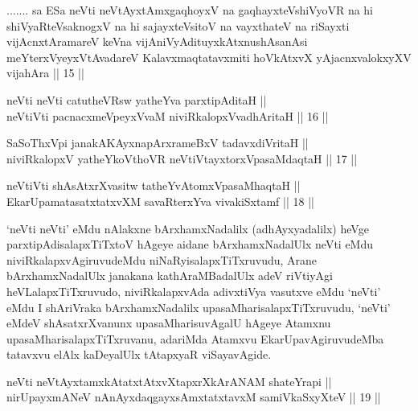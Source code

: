 \begin{kandikeshl}
....... sa ESa neVti neVtAyxtAmxgaqhoyxV na gaqhayxteV\s shiVyoVR na hi shiVyaRteV\s saknogxV na hi sajayxteV\s sitoV na vayxthateV na riSayxti vijAcnxtAramareV keVna vijAniVyAdituyxkAtxnushAsanAsi meYterxVyeyxVtAvadareV Kalavxmaqtatavxmiti hoVkAtxvX yAjacnxvalokxyXV vijahAra || 15 ||
\end{kandikeshl}

\begin{shl}
neVti neVti catutheVR\s sw yatheYva parxtipAditaH || \\
neVtiVti pacnacxmeV\s peyxVvaM niviRkalopxV\s vadhAritaH \hfill || 16 ||  
\end{shl}
				
\begin{shl}
SaSoThxV\s pi janakAKAyxnapArxrameBxV tadavxdiVritaH || \\
niviRkalopxV yatheYkoV\s thoVR  neVtiVtayxtorxVpasaMdaqtaH \hfill || 17 ||  
\end{shl}

\begin{shl}
neVtiVti shAsAtxrXvasitw tatheYvA\s \s tomxVpasaMhaqtaH || \\
EkarUpamatasatxtatxvXM savaRterxYva vivakiSxtamf \hfill || 18 ||  
\end{shl}

\begin{artha}
`neVti neVti' eMdu nAlakxne bArxhamxNadalilx (adhAyxyadalilx) heVge parxtipAdisalapxTiTxtoV hAgeye aidane bArxhamxNadalUlx neVti eMdu niviRkalapxvAgiruvudeMdu niNaRyisalapxTiTxruvudu, Arane bArxhamxNadalUlx janakana kathAraMBadalUlx adeV riVtiyAgi heVLalapxTiTxruvudo, niviRkalapxvAda adivxtiVya vasutxve eMdu `neVti' eMdu I shAriVraka bArxhamxNadalilx upasaMharisalapxTiTxruvudu, `neVti' eMdeV shAsatxrXvanunx upasaMharisuvAgalU hAgeye Atamxnu upasaMharisalapxTiTxruvanu, adariMda Atamxvu EkarUpavAgiruvudeMba tatavxvu elAlx kaDeyalUlx tAtapxyaR viSayavAgide.
\end{artha}

\begin{shl}
neVti neVtAyxtamxkAtatxtAtxvXtapxrXkArANAM shateYrapi || \\
nirUpayxmANeV nAnAyxdaqgayxsAmxtatxtavxM samiVkaSxyXteV \hfill || 19 ||  
\end{shl}
				
